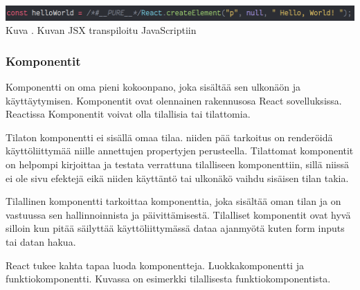 \bigskip
\includegraphics[width=15cm]{src/public/oppar/transpiled_jsx_example.png}\\
Kuva \getImgCount {}. Kuvan \prevImageCount{} JSX transpiloitu JavaScriptiin
\medskip





\subsubsection{Komponentit}











Komponentti on oma pieni kokoonpano, joka sisältää sen ulkonäön ja käyttäytymisen.
Komponentit ovat olennainen rakennusosa React sovelluksissa.
Reactissa Komponentit voivat olla tilallisia tai tilattomia. 
\medskip



%
Tilaton komponentti ei sisällä omaa tilaa. 
niiden pää tarkoitus on renderöidä käyttöliittymää niille annettujen propertyjen perusteella.
Tilattomat komponentit on helpompi kirjoittaa ja testata verrattuna tilalliseen komponenttiin, 
sillä niissä ei ole sivu efektejä eikä niiden käyttäntö tai ulkonäkö vaihdu sisäisen tilan takia.
\medskip


Tilallinen komponentti tarkoittaa komponenttia, joka sisältää oman tilan ja on vastuussa sen hallinnoinnista ja päivittämisestä.
Tilalliset komponentit ovat hyvä silloin kun pitää säilyttää käyttöliittymässä dataa ajanmyötä kuten form inputs tai datan hakua.\\
\medskip







React tukee kahta tapaa luoda komponentteja. Luokkakomponentti ja funktiokomponentti.
Kuvassa \nextImageCount {} on esimerkki tilallisesta funktiokomponentista.
\medskip


